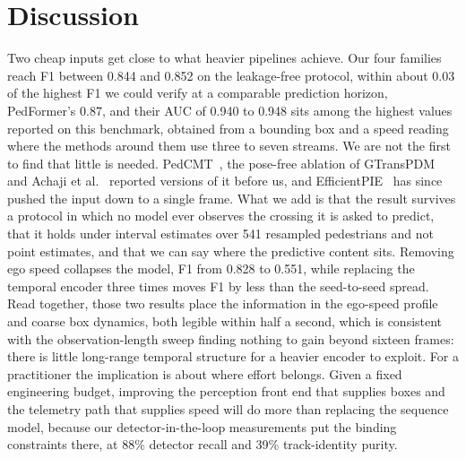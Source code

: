 \documentclass[mti,article,submit,moreauthors]{Definitions/mdpi}
\begin{document}
\section{Discussion}
\label{sec:discussion}

Two cheap inputs get close to what heavier pipelines achieve. Our four families reach F1 between 0.844 and 0.852 on the leakage-free protocol, within about 0.03 of the highest F1 we could verify at a comparable prediction horizon, PedFormer's 0.87, and their AUC of 0.940 to 0.948 sits among the highest values reported on this benchmark, obtained from a bounding box and a speed reading where the methods around them use three to seven streams. We are not the first to find that little is needed. PedCMT~\citep{chen2024pedcmt}, the pose-free ablation of GTransPDM~\citep{xie2025gtranspdm} and Achaji et al.~\citep{achaji2022attention} reported versions of it before us, and EfficientPIE~\citep{qu2025efficientpie} has since pushed the input down to a single frame. What we add is that the result survives a protocol in which no model ever observes the crossing it is asked to predict, that it holds under interval estimates over 541 resampled pedestrians and not point estimates, and that we can say where the predictive content sits. Removing ego speed collapses the model, F1 from 0.828 to 0.551, while replacing the temporal encoder three times moves F1 by less than the seed-to-seed spread. Read together, those two results place the information in the ego-speed profile and coarse box dynamics, both legible within half a second, which is consistent with the observation-length sweep finding nothing to gain beyond sixteen frames: there is little long-range temporal structure for a heavier encoder to exploit. For a practitioner the implication is about where effort belongs. Given a fixed engineering budget, improving the perception front end that supplies boxes and the telemetry path that supplies speed will do more than replacing the sequence model, because our detector-in-the-loop measurements put the binding constraints there, at 88\% detector recall and 39\% track-identity purity.
\end{document}
